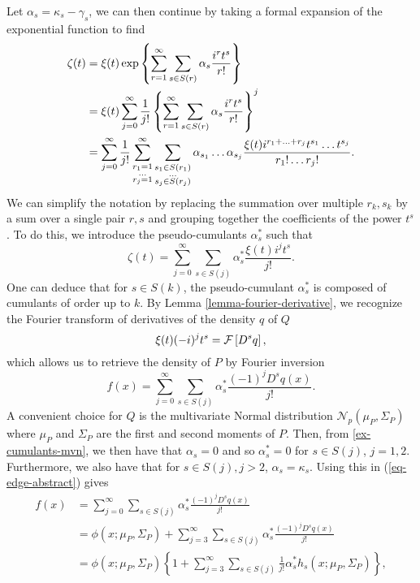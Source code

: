 Let $\alpha_s = \kappa_s - \gamma_s$, we can then continue by taking a formal expansion of the exponential function to find
\begin{align*}
    \zeta(t)
    &= \xi(t)\exp\left\{\sum_{r=1}^\infty \sum_{s \in S(r)} \alpha_s\frac{i^r t^s}{r!}\right\}\\
    &= \xi(t)\sum_{j=0}^\infty \frac{1}{j!} \left\{\sum_{r=1}^\infty \sum_{s \in S(r)} \alpha_s\frac{i^r t^s}{r!}\right\}^j \\
    &=
    \sum_{j=0}^\infty \frac{1}{j!} 
    \sum_{\substack{r_1 = 1\\ \ldots \\r_j = 1}}^\infty
    \sum_{\substack{s_1 \in S(r_1)\\ \ldots \\s_j \in S(r_j)}}
    \alpha_{s_1}\ldots\alpha_{s_j}
    \frac{
        \xi(t) i^{r_1 + \ldots + r_j}
        t^{s_1} \ldots t^{s_j}
    }{
        r_1! \ldots r_j!
    }.
\end{align*}
We can simplify the notation by replacing the summation over multiple $r_k, s_k$ by a sum over a single pair $r, s$ and grouping together the coefficients of the power $t^s$. To do this, we introduce the pseudo-cumulants $\alpha^*_s$ such that
\begin{equation*}
    \zeta(t) = 
    \sum_{j=0}^\infty 
    \sum_{s \in S(j)}
    \alpha^*_s \frac{\xi(t) i^{j} t^{s}}{j!}.
\end{equation*}
One can deduce that for $s \in S(k)$, the pseudo-cumulant $\alpha^*_s$ is composed of cumulants of order up to $k$. By Lemma \ref{lemma-fourier-derivative}, we recognize the Fourier transform of derivatives of the density $q$ of $Q$
\begin{equation*}
    \xi(t) (-i)^{j} t^s  = \mathcal{F} \left[ D^s q \right],
\end{equation*}
which allows us to retrieve the density of $P$ by Fourier inversion
\begin{equation}\label{eq-edge-abstract}
    f(x) = 
    \sum_{j=0}^\infty 
    \sum_{s \in S(j)}
    \alpha^*_s \frac{(-1)^j D^s q(x)}{j!}.
\end{equation}
A convenient choice for $Q$ is the multivariate Normal distribution $\mathcal{N}_p(\mu_P, \Sigma_P)$ where $\mu_P$ and $\Sigma_P$ are the first and second moments of $P$. Then, from \ref{ex-cumulants-mvn}, we then have that $\alpha_s = 0$ and so $\alpha^*_s = 0$ for $s \in S(j)$, $j= 1, 2$. Furthermore, we also have that for $s \in S(j), j > 2$, $\alpha_s = \kappa_s$. Using this in (\ref{eq-edge-abstract}) gives
\begin{align}
    f(x) 
    &= \sum_{j=0}^\infty  \sum_{s \in S(j)} \alpha^*_s \frac{(-1)^j D^s q(x)}{j!} \nonumber \\
    &= \phi(x; \mu_P, \Sigma_P) + \sum_{j=3}^\infty  \sum_{s \in S(j)} \alpha^*_s \frac{(-1)^j D^s q(x)}{j!} \nonumber \\
    &= \phi(x; \mu_P, \Sigma_P) \left\{
        1 + \sum_{j=3}^\infty  \sum_{s \in S(j)} \frac{1}{j!}\alpha^*_s h_s(x; \mu_P, \Sigma_P)
    \right\}, \label{eq-edgeworth-full}
\end{align} 

